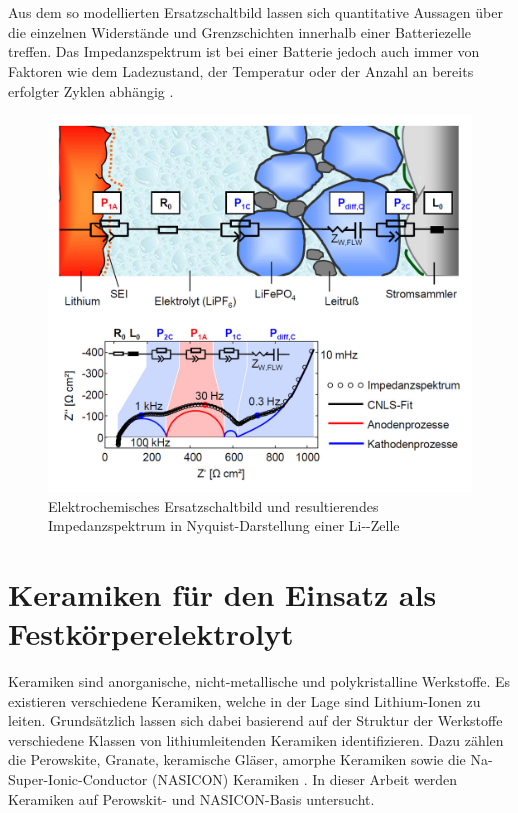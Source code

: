 \documentclass[a4paper, 11pt, headsepline,footsepline,twoside,abstract]{scrbook}
\begin{document}
\\\\
Aus dem so modellierten Ersatzschaltbild lassen sich quantitative Aussagen über die einzelnen Widerstände und Grenzschichten innerhalb einer Batteriezelle treffen. Das Impedanzspektrum ist bei einer Batterie jedoch auch immer von Faktoren wie dem Ladezustand, der Temperatur oder der Anzahl an bereits erfolgter Zyklen abhängig \cite{Linden2011}.
\begin{figure}
	\centering
	\includegraphics[width=0.8\columnwidth]{images/Schema_IS.jpg}
	\caption{Elektrochemisches Ersatzschaltbild und resultierendes Impedanzspektrum in Nyquist-Darstellung einer Li--Zelle \cite{bub_skript}}
	\label{schema_is}
\end{figure}
\section{Keramiken für den Einsatz als Festkörperelektrolyt}
\label{grundlagen_keramik}
Keramiken sind anorganische, nicht-metallische und polykristalline Werkstoffe. Es existieren verschiedene Keramiken, welche in der Lage sind Lithium-Ionen zu leiten. Grundsätzlich lassen sich dabei basierend auf der Struktur der Werkstoffe verschiedene Klassen von lithiumleitenden Keramiken identifizieren. Dazu zählen die Perowskite, Granate, keramische Gläser, amorphe Keramiken sowie die Na-Super-Ionic-Conductor (NASICON) Keramiken \cite{tatsumisago2013recent}. In dieser Arbeit werden Keramiken auf Perowskit- und NASICON-Basis untersucht.
\end{document}
